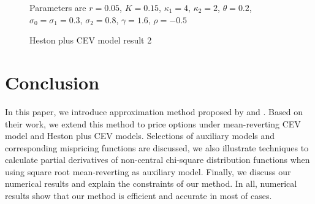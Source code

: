 \begin{figure}[ht]
  \hfill
  \caption{Heston plus CEV model result 2}
  \small{Parameters are $r=0.05$, $K=0.15$, $\kappa_1=4$, $\kappa_2=2$, $\theta=0.2$, $\sigma_0=\sigma_1=0.3$, $\sigma_2=0.8$, $\gamma=1.6$, $\rho=-0.5$}
  \label{2d price comparison2}
\end{figure}

\chapter{Conclusion}\label{ch5}

In this paper, we introduce approximation method proposed by \cite{heath_variance_2002} and \cite{kristensen_adding_2011}. Based on their work, we extend this method to price options under mean-reverting CEV model and Heston plus CEV models. Selections of auxiliary models and corresponding mispricing functions are discussed, we also illustrate techniques to calculate partial derivatives of non-central chi-square distribution functions when using square root mean-reverting as auxiliary model. Finally, we discuss our numerical results and explain the constraints of our method. In all, numerical results show that our method is efficient and accurate in most of cases.